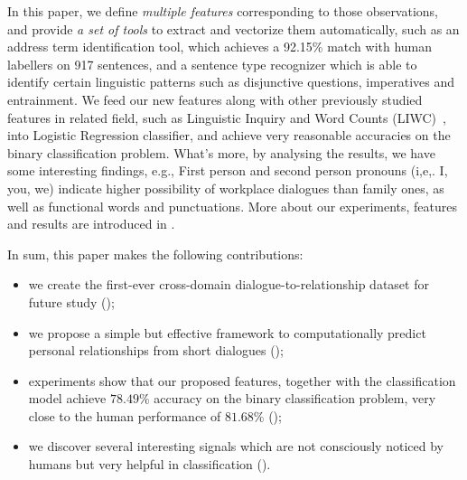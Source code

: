 In this paper, we define {\em multiple features} corresponding to 
those observations, and provide {\em a set of tools} to extract and vectorize them 
automatically, such as an address term identification tool, 
which achieves a 92.15\% match with human labellers on 
917 sentences, and a sentence type recognizer which is able to 
identify certain linguistic patterns such as disjunctive questions, 
imperatives and entrainment. We feed our new features along with 
other previously studied features in related field,  
such as Linguistic Inquiry and Word Counts (LIWC)~\cite{liwc}, into 
Logistic Regression classifier, and achieve very reasonable accuracies on 
the binary classification problem. 
What's more, by analysing the results, we have some interesting 
findings, e.g., First person and second person pronouns (i,e,. I, you, we) indicate
higher possibility of workplace dialogues than family ones, as well as functional 
words and punctuations. 
More about our experiments, features and results are introduced in . 




In sum, this paper makes the following contributions:
\begin{itemize}
\item we create the first-ever cross-domain dialogue-to-relationship dataset 
for future study ();
\item we propose a simple but effective framework to computationally predict
personal relationships from short dialogues ();
\item experiments show that our proposed features, together with the 
classification model achieve $78.49\%$ accuracy on the binary classification
problem, very close to the human performance of $81.68\%$ ();
\item we discover several interesting signals which are not consciously
noticed by humans but very helpful in classification ().
\end{itemize}


